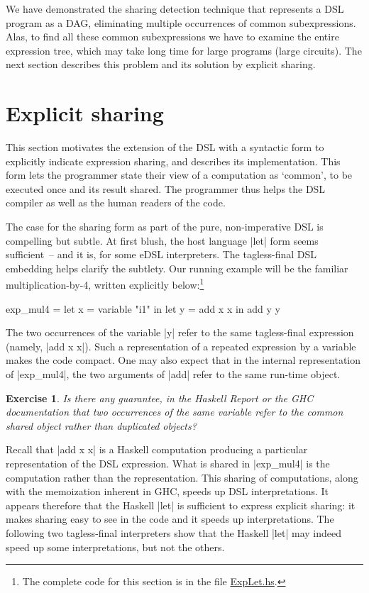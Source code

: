 \documentclass[submission,copyright,creativecommons]{eptcs}
\newtheorem{Exercise}{Exercise} \newcommand\aside[1]{}
\begin{document}
We have demonstrated the sharing detection technique that represents
a DSL program as a DAG, eliminating multiple occurrences of common
subexpressions. Alas, to find all these common subexpressions we have
to examine the entire expression tree, which may take long time for large
programs (large circuits). The next section describes this problem 
and its solution by explicit sharing.

\section{Explicit sharing}
\label{s:obj-let}

This section motivates the extension of the DSL with a syntactic form
to explicitly indicate expression sharing, and describes its
implementation. This form lets the programmer state their view of a
computation as `common', to be executed once and its result
shared. The programmer thus helps the DSL compiler as well as the human
readers of the code.

The case for the sharing form as part of the pure, non-imperative DSL is
compelling but subtle. At first blush, the
host language |let| form seems sufficient~-- and it is, for some eDSL
interpreters. The tagless-final DSL embedding helps clarify the
subtlety. Our running example will be the familiar
multiplication-by-4, written explicitly below:\footnote{
The complete code for this section is in the file \url{ExpLet.hs}.}
\begin{code}
exp_mul4 = 
 let x = variable "i1" in
 let y = add x x in
 add y y
\end{code}
The two occurrences of the variable |y| refer to the same
tagless-final expression (namely, |add x x|). Such a representation of
a repeated expression by a variable makes the code compact. 
One may also expect that in the internal representation of |exp_mul4|,
the two arguments of |add| refer to the same run-time object.
\begin{Exercise}
Is there any guarantee, in the Haskell Report or the GHC documentation
that two occurrences of the same variable refer to the common shared
object rather than duplicated objects?
\end{Exercise}
Recall that |add x x| is a Haskell computation producing a particular
representation of the DSL expression. What is shared in |exp_mul4| is
the computation rather than the representation. This sharing of
computations, along with the memoization inherent in GHC, speeds up
DSL interpretations. It appears therefore that the Haskell |let| is
sufficient to express explicit sharing: it makes sharing easy to
see in the code and it speeds up interpretations.  The following two
tagless-final interpreters show that the Haskell |let| may indeed
speed up some interpretations, but not the others.
\end{document}
